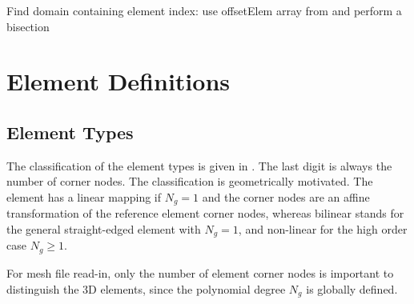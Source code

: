 \documentclass[a4paper,headsepline]{scrreprt}
\newcommand\rf[1]{\prettyref{#1}}
\newcommand\Ngeo{N_g}
\begin{document}
\begin{algorithm}[h!]
 \caption{Find domain containing element index: use offsetElem array from \rf{alg:dode} and perform a bisection \label{alg:elemID}}
 \DontPrintSemicolon
\end{algorithm}

\chapter{Element Definitions}

\section{Element Types}
\label{sec:elemtypes}
The classification of the element types is given in \rf{tab:elemtype}. The last digit is always the number of corner nodes. The classification is geometrically motivated. The element has a linear mapping if $\Ngeo=1$ and the corner nodes are an affine transformation of the reference element corner nodes, whereas bilinear stands for the general straight-edged element with $\Ngeo=1$, and non-linear for the high order case $\Ngeo \ge 1$. 

For mesh file read-in, only the number of element corner nodes is important to distinguish the 3D elements, since the polynomial degree $\Ngeo$ is globally defined. 
\end{document}
